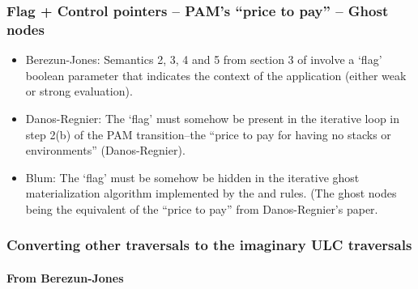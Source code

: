 \documentclass{article}
\theoremstyle{definition}
\newcommand{\ghostlmd}{{\lambda\!\!\lambda}}
\begin{document}
\subsubsection{Flag + Control pointers -- PAM's ``price to pay''  -- Ghost nodes}
\begin{itemize}
  \item Berezun-Jones: Semantics 2, 3, 4 and 5 from section 3 of \cite{JonesBerezunLLL} involve a `flag' boolean parameter that indicates the context of the application (either weak or strong evaluation).
  \item Danos-Regnier: The `flag' must somehow be present in the iterative loop in step 2(b) of the PAM transition--the ``price to pay for having no stacks or environments'' (Danos-Regnier).
  \item Blum: The `flag' must be somehow be hidden in the iterative ghost materialization algorithm implemented by the  and \rulenamet{Lam^\ghostlmd} rules. (The ghost nodes being the equivalent of the ``price to pay'' from Danos-Regnier's paper.
\end{itemize}


\subsubsection{Converting other traversals to the imaginary ULC traversals}

\paragraph{From Berezun-Jones}
\end{document}
